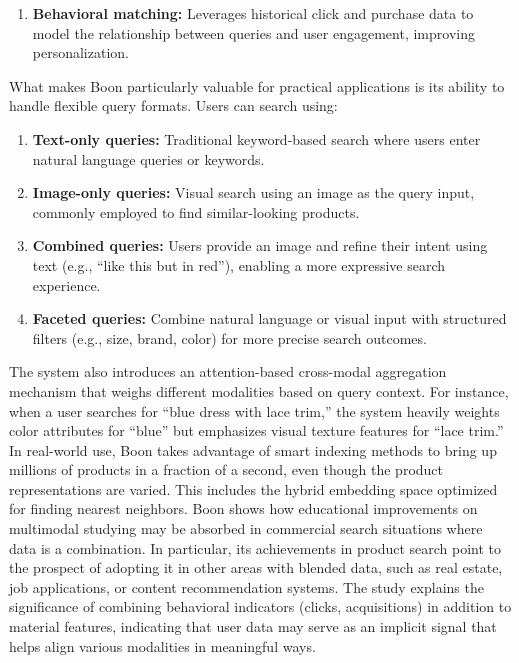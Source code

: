 \documentclass[conference]{IEEEtran}
\begin{document}
\begin{enumerate}
\begin{enumerate}
    \item \textbf{Behavioral matching:} Leverages historical click and purchase data to model the relationship between queries and user engagement, improving personalization.
\end{enumerate}

What makes Boon particularly valuable for practical applications is its ability to handle flexible query formats. Users can search using:

\begin{enumerate}
    \item \textbf{Text-only queries:} Traditional keyword-based search where users enter natural language queries or keywords.
    
    \item \textbf{Image-only queries:} Visual search using an image as the query input, commonly employed to find similar-looking products.
    
    \item \textbf{Combined queries:} Users provide an image and refine their intent using text (e.g., “like this but in red”), enabling a more expressive search experience.
    
    \item \textbf{Faceted queries:} Combine natural language or visual input with structured filters (e.g., size, brand, color) for more precise search outcomes.
\end{enumerate}

The system also introduces an attention-based cross-modal aggregation mechanism that weighs different modalities based on query context. For instance, when a user searches for “blue dress with lace trim,” the system heavily weights color attributes for “blue” but emphasizes visual texture features for “lace trim.”
In real-world use, Boon takes advantage of smart indexing methods to bring up millions of products in a fraction of a second, even though the product representations are varied. This includes the hybrid embedding space optimized for finding nearest neighbors.
Boon shows how educational improvements on multimodal studying may be absorbed in commercial search situations where data is a combination. In particular, its achievements in product search point to the prospect of adopting it in other areas with blended data, such as real estate, job applications, or content recommendation systems.
The study explains the significance of combining behavioral indicators (clicks, acquisitions) in addition to material features, indicating that user data may serve as an implicit signal that helps align various modalities in meaningful ways.



\end{enumerate}
\end{document}
